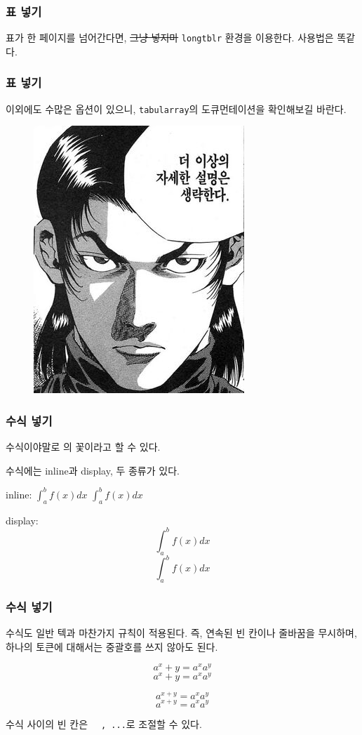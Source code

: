 \begin{frame}
    \frametitle{표 넣기}

    표가 한 페이지를 넘어간다면, \sout{그냥 넣지마} \texttt{longtblr} 환경을 이용한다. 사용법은 똑같다.

\end{frame}

\begin{frame}
    \frametitle{표 넣기}

    이외에도 수많은 옵션이 있으니, \texttt{tabularray}의 도큐먼테이션을 확인해보길 바란다.

    \begin{figure}
        \centering
        \includegraphics[height=0.7\textheight]{noexplanation.jpg}
    \end{figure}

\end{frame}

\begin{frame}[fragile]
    \frametitle{수식 넣기}

    수식이야말로 \tex{}의 꽃이라고 할 수 있다.

    수식에는 inline과 display, 두 종류가 있다.

    inline: \texttt{$\int_a^b f(x) dx$} $\int_a^b f(x) dx$

    display: \texttt{\[ \int_a^b f(x) dx \]} \[ \int_a^b f(x) dx \]

\end{frame}

\begin{frame}[fragile]
    \frametitle{수식 넣기}

    수식도 일반 텍과 마찬가지 규칙이 적용된다. 즉, 연속된 빈 칸이나 줄바꿈을 무시하며, 하나의 토큰에 대해서는 중괄호를 쓰지 않아도 된다.

    \texttt{\[ a^x+y     = a^xa^y \]}
    \[ a^x+y     = a^xa^y \]

    \texttt{\[ a^{x+y} = a^xa^y \]}
    \[ a^{x+y} = a^xa^y \]

    수식 사이의 빈 칸은 \texttt{\, \quad, ...}로 조절할 수 있다.

\end{frame}


